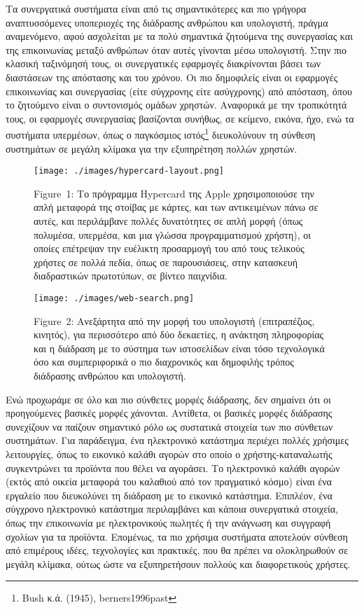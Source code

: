 \documentclass[
]{article}
\begin{document}
Τα συνεργατικά συστήματα είναι από τις σημαντικότερες και πιο γρήγορα
αναπτυσσόμενες υποπεριοχές της διάδρασης ανθρώπου και υπολογιστή, πράγμα
αναμενόμενο, αφού ασχολείται με τα πολύ σημαντικά ζητούμενα της
συνεργασίας και της επικοινωνίας μεταξύ ανθρώπων όταν αυτές γίνονται
μέσω υπολογιστή. Στην πιο κλασική ταξινόμησή τους, οι συνεργατικές
εφαρμογές διακρίνονται βάσει των διαστάσεων της απόστασης και του
χρόνου. Οι πιο δημοφιλείς είναι οι εφαρμογές επικοινωνίας και
συνεργασίας (είτε σύγχρονης είτε ασύγχρονης) από απόσταση, όπου το
ζητούμενο είναι ο συντονισμός ομάδων χρηστών. Αναφορικά με την
τροπικότητά τους, οι εφαρμογές συνεργασίας βασίζονται συνήθως, σε
κείμενο, εικόνα, ήχο, ενώ τα συστήματα υπερμέσων, όπως ο παγκόσμιος
ιστός\footnote{Bush κ.ά. (1945), berners1996past} διευκολύνουν τη
σύνθεση συστημάτων σε μεγάλη κλίμακα για την εξυπηρέτηση πολλών χρηστών.

\leavevmode{}%
\begin{figure}
\hypertarget{fig:hypercard-layout}{%
\centering
\texttt{[image: ./images/hypercard-layout.png]}
\caption{Figure~1: Το πρόγραμμα Hypercard της Apple χρησιμοποιούσε την
απλή μεταφορά της στοίβας με κάρτες, και των αντικειμένων πάνω σε αυτές,
και περιλάμβανε πολλές δυνατότητες σε απλή μορφή (όπως πολυμέσα,
υπερμέσα, και μια γλώσσα προγραμματισμού χρήστη), οι οποίες επέτρεψαν
την ευέλικτη προσαρμογή του από τους τελικούς χρήστες σε πολλά πεδία,
όπως σε παρουσιάσεις, στην κατασκευή διαδραστικών πρωτοτύπων, σε βίντεο
παιχνίδια.}\label{fig:hypercard-layout}
}
\end{figure}

\leavevmode{}%
\begin{figure}
\hypertarget{fig:web-search}{%
\centering
\texttt{[image: ./images/web-search.png]}
\caption{Figure~2: Ανεξάρτητα από την μορφή του υπολογιστή
(επιτραπέζιος, κινητός), για περισσότερο από δύο δεκαετίες, η ανάκτηση
πληροφορίας και η διάδραση με το σύστημα των ιστοσελίδων είναι τόσο
τεχνολογικά όσο και συμπεριφορικά ο πιο διαχρονικός και δημοφιλής τρόπος
διάδρασης ανθρώπου και υπολογιστή.}\label{fig:web-search}
}
\end{figure}

Ενώ προχωράμε σε όλο και πιο σύνθετες μορφές διάδρασης, δεν σημαίνει ότι
οι προηγούμενες βασικές μορφές χάνονται. Αντίθετα, οι βασικές μορφές
διάδρασης συνεχίζουν να παίζουν σημαντικό ρόλο ως συστατικά στοιχεία των
πιο σύνθετων συστημάτων. Για παράδειγμα, ένα ηλεκτρονικό κατάστημα
περιέχει πολλές χρήσιμες λειτουργίες, όπως το εικονικό καλάθι αγορών στο
οποίο ο χρήστης-καταναλωτής συγκεντρώνει τα προϊόντα που θέλει να
αγοράσει. Το ηλεκτρονικό καλάθι αγορών (εκτός από οικεία μεταφορά του
καλαθιού από τον πραγματικό κόσμο) είναι ένα εργαλείο που διευκολύνει τη
διάδραση με το εικονικό κατάστημα. Επιπλέον, ένα σύγχρονο ηλεκτρονικό
κατάστημα περιλαμβάνει και κάποια συνεργατικά στοιχεία, όπως την
επικοινωνία με ηλεκτρονικούς πωλητές ή την ανάγνωση και συγγραφή σχολίων
για τα προϊόντα. Επομένως, τα πιο χρήσιμα συστήματα αποτελούν σύνθεση
από επιμέρους ιδέες, τεχνολογίες και πρακτικές, που θα πρέπει να
ολοκληρωθούν σε μεγάλη κλίμακα, ούτως ώστε να εξυπηρετήσουν πολλούς και
διαφορετικούς χρήστες.
\end{document}
